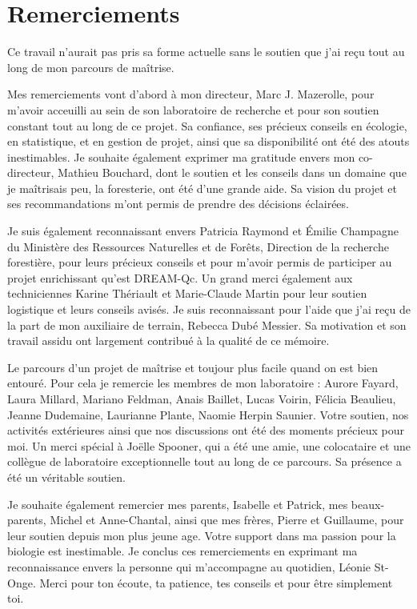 \chapter*{Remerciements}        %
\label{chap-remerciements}      %


 Ce travail n'aurait pas pris sa forme actuelle sans le soutien que j'ai reçu tout au long de mon parcours de maîtrise.

 Mes remerciements vont d'abord à mon directeur, Marc J. Mazerolle, pour m'avoir acceuilli au sein de son laboratoire de recherche et pour son soutien constant tout au long de ce projet. 
 Sa confiance, ses précieux conseils en écologie, en statistique, et en gestion de projet, ainsi que sa disponibilité ont été des atouts inestimables.
 Je souhaite également exprimer ma gratitude envers mon co-directeur, Mathieu Bouchard, dont le soutien et les conseils dans un domaine que je maîtrisais peu, la foresterie, ont été d'une grande aide. 
 Sa vision du projet et ses recommandations m'ont permis de prendre des décisions éclairées.

 Je suis également reconnaissant envers Patricia Raymond et Émilie Champagne du Ministère des Ressources Naturelles et de Forêts, Direction de la recherche forestière, pour leurs précieux conseils et 
 pour m'avoir permis de participer au projet enrichissant qu'est DREAM-Qc.
 Un grand merci également aux techniciennes Karine Thériault et Marie-Claude Martin pour leur soutien logistique et leurs conseils avisés.
 Je suis reconnaissant pour l'aide que j'ai reçu de la part de mon auxiliaire de terrain, Rebecca Dubé Messier. Sa motivation et son travail assidu ont largement contribué à la qualité de ce mémoire.

 Le parcours d'un projet de maîtrise et toujour plus facile quand on est bien entouré. 
 Pour cela je remercie les membres de mon laboratoire : 
 Aurore Fayard, Laura Millard, Mariano Feldman, Anais Baillet, Lucas Voirin, Félicia Beaulieu, Jeanne Dudemaine, Laurianne Plante, Naomie Herpin Saunier. 
 Votre soutien, nos activités extérieures ainsi que nos discussions ont été des moments précieux pour moi.
 Un merci spécial à Joëlle Spooner, qui a été une amie, une colocataire et une collègue de laboratoire exceptionnelle tout au long de ce parcours. 
 Sa présence a été un véritable soutien.

 Je souhaite également remercier mes parents, Isabelle et Patrick, mes beaux-parents, Michel et Anne-Chantal, ainsi que mes frères, Pierre et Guillaume, pour leur soutien depuis 
 mon plus jeune age. Votre support dans ma passion pour la biologie est inestimable.
 Je conclus ces remerciements en exprimant ma reconnaissance envers la personne qui m'accompagne au quotidien, Léonie St-Onge. 
 Merci pour ton écoute, ta patience, tes conseils et pour être simplement toi.

